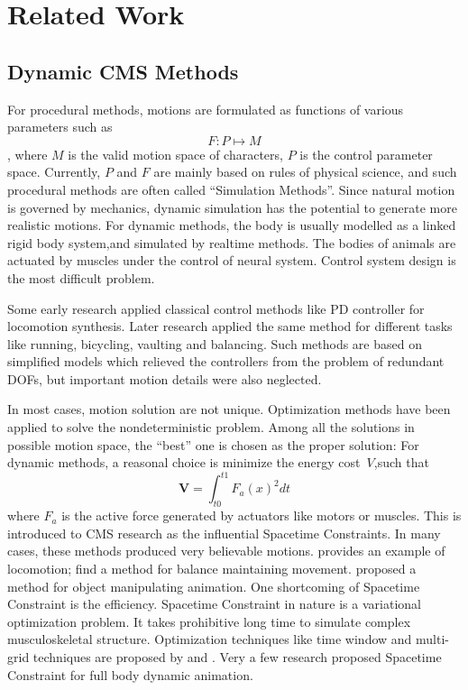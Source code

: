 \section{Related Work}

\subsection{Dynamic CMS Methods}
For procedural methods, motions are formulated as functions of various parameters such as
\[
F:P \mapsto M
\],
where $M$ is the valid motion space of characters, $P$ is the control parameter space.
Currently, $P$ and $F$ are mainly based on rules of physical science, and such procedural methods are often called ``Simulation Methods''. 
Since natural motion is governed by mechanics, dynamic simulation has the potential to generate more realistic motions. 
For dynamic methods, the body is usually modelled as a linked rigid body system,and simulated by realtime methods\citep{Baraff1994,Mirtich1996,Stewart2000}. 
The bodies of animals are actuated by muscles under the control of neural system. 
Control system design is the most difficult problem.

Some early research applied classical control methods like PD controller \citep{Raibert1991} for locomotion synthesis.
Later research \citep{Hodgins1995} applied the same method for different tasks like running, bicycling, vaulting and balancing. 
Such methods are based on simplified models which relieved the controllers from the problem of redundant DOFs, 
but important motion details were also neglected.


In most cases, motion solution are not unique.
Optimization methods have been applied to solve the nondeterministic problem. 
Among all the solutions in possible motion space, the ``best'' one is chosen as the proper solution:
For dynamic methods,  a reasonal choice is minimize the energy cost~$V$,such that 
\[
\textbf{V}=\int_{t0}^{t1}F_{a}(x)^2dt
\]
where $F_{a}$ is the active force generated by actuators like motors or muscles. 
This is introduced to CMS research as the influential Spacetime Constraints\citep{Witkin1988}. 
In many cases, these methods produced very believable motions. 
\citet{Jain2009} provides an example of locomotion;  
\citet{BalanceControl} find a method for balance maintaining movement. 
\citet{Liu2009} proposed a method for object manipulating animation. 
One shortcoming of Spacetime Constraint is the efficiency.
Spacetime Constraint in nature is a variational optimization problem. 
It takes prohibitive long time to simulate complex musculoskeletal structure\citep{Anderson2001}. 
Optimization techniques like time window and multi-grid techniques are proposed by \citet{Cohen1992} and \citet{Liu1994}. 
Very a few research \citep{Popovi'c1999} proposed Spacetime Constraint for full body dynamic animation.

